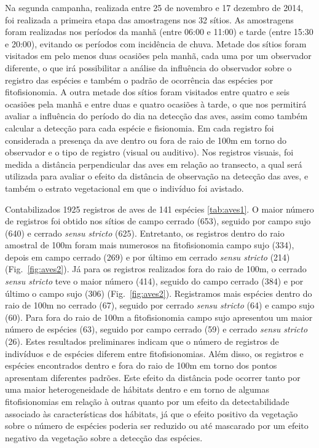 Na segunda campanha, realizada entre 25 de novembro e 17 dezembro de
2014, foi realizada a primeira etapa das amostragens nos 32 sítios. 
As amostragens foram realizadas nos períodos da manhã (entre 06:00 e
11:00) e tarde (entre 15:30 e 20:00), evitando os períodos com
incidência de chuva. Metade dos sítios foram visitados em
pelo menos duas ocasiões pela manhã, cada uma por um observador
diferente, o que irá possibilitar a análise da influência do
observador sobre o registro das espécies e também o
padrão de ocorrência das espécies por fitofisionomia. A outra metade
dos sítios foram visitados entre quatro e seis ocasiões pela manhã e
entre duas e quatro ocasiões à tarde, o que nos permitirá avaliar a
influência do período do dia na detecção das aves, assim como também
calcular a detecção para cada espécie e fisionomia. Em cada registro
foi considerada a presença da ave dentro ou fora de raio de 100m em torno do observador
e o tipo de registro (visual ou auditivo). Nos registros visuais, foi
medida a distância perpendicular das aves em relação ao
transecto, a qual será utilizada para avaliar o efeito da distância de
observação na detecção das aves, e também o estrato vegetacional em que o
indivíduo foi avistado. 

Contabilizados 1925 registros de aves de 141 espécies \ref{tab:aves1}.
O maior número de
registros foi obtido nos sítios de campo cerrado (653), seguido
por campo sujo (640) e cerrado \textit{sensu stricto}
(625). Entretanto, os
registros dentro do raio amostral de 100m foram mais numerosos na
fitofisionomia campo sujo (334), depois em campo cerrado (269) e por
último em cerrado \textit{sensu stricto} (214) (Fig.~\ref{fig:aves2}). 
Já para os
registros realizados fora do raio de 100m,
o cerrado \textit{sensu stricto} teve o maior número (414), 
seguido do campo cerrado (384) e
por último o campo sujo (306) (Fig.~\ref{fig:aves2}). 
Registramos mais espécies dentro do raio de 100m no
cerrado (67), seguido por cerrado \textit{sensu stricto} (64) e campo
sujo (60). Para fora do raio de 100m 
a fitofisionomia campo sujo apresentou um maior número de espécies (63), seguido por campo
cerrado (59) e cerrado \textit{sensu stricto} (26).
Estes resultados preliminares indicam que o número de registros de indivíduos e de espécies
diferem entre fitofisionomias. Além disso, 
os registros e espécies encontrados dentro e fora do raio de 100m
em torno dos pontos apresentam diferentes padrões. Este efeito da
distância pode ocorrer tanto por uma maior heterogeneidade de hábitats
dentro e em torno de algumas fitofisionomias em relação à outras quanto por um
efeito da detectabilidade associado às características dos hábitats,
já que o efeito positivo da vegetação sobre o número de espécies
poderia ser reduzido ou até mascarado por um efeito negativo da
vegetação sobre a detecção das espécies.

